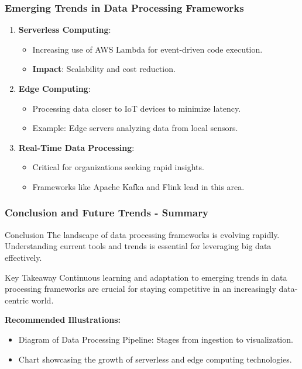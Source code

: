 \documentclass[aspectratio=169]{beamer}
\begin{document}
\begin{frame}[fragile]
  \frametitle{Emerging Trends in Data Processing Frameworks}

  \begin{enumerate}
      \item \textbf{Serverless Computing}:
      \begin{itemize}
          \item Increasing use of AWS Lambda for event-driven code execution.
          \item \textbf{Impact}: Scalability and cost reduction.
      \end{itemize}

      \item \textbf{Edge Computing}:
      \begin{itemize}
          \item Processing data closer to IoT devices to minimize latency.
          \item Example: Edge servers analyzing data from local sensors.
      \end{itemize}

      \item \textbf{Real-Time Data Processing}:
      \begin{itemize}
          \item Critical for organizations seeking rapid insights.
          \item Frameworks like Apache Kafka and Flink lead in this area.
      \end{itemize}
  \end{enumerate}

\end{frame}

\begin{frame}[fragile]
  \frametitle{Conclusion and Future Trends - Summary}

  \begin{block}{Conclusion}
      The landscape of data processing frameworks is evolving rapidly. Understanding current tools and trends is essential for leveraging big data effectively. 
  \end{block}
  
  \begin{block}{Key Takeaway}
      Continuous learning and adaptation to emerging trends in data processing frameworks are crucial for staying competitive in an increasingly data-centric world.
  \end{block}
  
  \textbf{Recommended Illustrations:}
  \begin{itemize}
      \item Diagram of Data Processing Pipeline: Stages from ingestion to visualization.
      \item Chart showcasing the growth of serverless and edge computing technologies.
  \end{itemize}
  
\end{frame}
\end{document}

